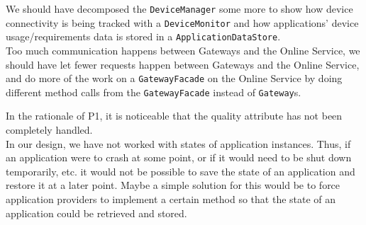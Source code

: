     We should have decomposed the \texttt{DeviceManager} some more to show how device connectivity is being tracked with a \texttt{DeviceMonitor} and how
    applications' device usage/requirements data is stored in a \texttt{ApplicationDataStore}.\\

    Too much communication happens between Gateways and the Online Service, we should have let fewer requests happen between Gateways and the Online Service,
    and do more of the work on a \texttt{GatewayFacade} on the Online Service by doing different method calls from the \texttt{GatewayFacade} instead of \texttt{Gateway}s.

    In the rationale of P1, it is noticeable that the quality attribute has not been completely handled. \\

    In our design, we have not worked with states of application instances. Thus, if an application were to crash at some point, or if it would need to be shut down temporarily, etc.
    it would not be possible to save the state of an application and restore it at a later point. Maybe a simple solution for this would be to force application providers to
    implement a certain method so that the state of an application could be retrieved and stored.
